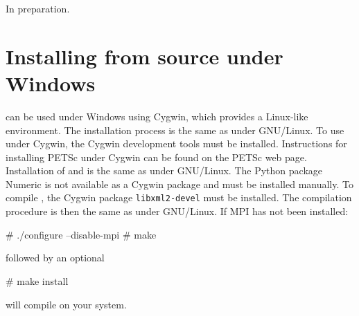 In preparation.

\section{Installing from source under Windows}
\label{app:cygwin}

\dolfin{} can be used under Windows using Cygwin, which provides a Linux-like
environment. The installation process is the same as under GNU/Linux. 
To use \dolfin{} under Cygwin, the Cygwin development tools must be installed. 
Instructions for installing PETSc under Cygwin can be found on the  PETSc web 
page. Installation of \ffc{} and \fiat{} is the same as under GNU/Linux. The 
Python package Numeric is not available as a Cygwin package and must be 
installed manually. To compile \dolfin{}, the Cygwin package  
\texttt{libxml2-devel} must be installed. The compilation procedure is then the
same as under GNU/Linux. If MPI has not been installed:
\begin{code}
  # ./configure --disable-mpi
  # make
\end{code}
followed by an optional
\begin{code}
  # make install
\end{code}
will compile \dolfin{} on your system.
